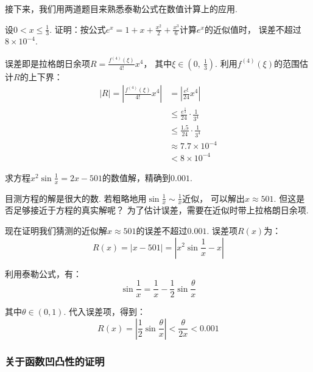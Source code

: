 接下来，我们用两道题目来熟悉泰勒公式在数值计算上的应用.

\begin{example}
\label{ex:ch04-40}
设$0 < x \le \frac{1}{3}$.
证明：按公式$e^x = 1 + x +\frac{x^2}{2} + \frac{x^3}{6}$计算$e^x$的近似值时，
误差不超过$8 \times {10}^{-4}$.
\end{example}

\begin{solution}
误差即是拉格朗日余项$R = \frac{f^{(4)}(\xi)}{4!} x^4$，
其中$\xi \in \left(0,~\frac{1}{3}\right)$.
利用$f^{(4)}(\xi)$的范围估计$R$的上下界：
\begin{equation}
    \begin{aligned}
        |R| = \left|\frac{f^{(4)}(\xi)}{4!} x^4\right| &= \left| \frac{e^{\xi}}{24} x^4 \right| \\
        &\le  \frac{e^{\frac{1}{3}}}{24} \cdot \frac{1}{3^4}  \\
        &\le \frac{1.5}{24} \cdot \frac{1}{3^4} \\
        &\approx 7.7\times {10}^{-4} \\
        &< 8 \times {10}^{-4}
        \nonumber
    \end{aligned}
\end{equation}
\end{solution}

\begin{example}
\label{ex:ch04-41}
求方程$x^2 \sin \frac{1}{x} = 2x -501$的数值解，精确到$0.001$.
\end{example}

\begin{analysis}
目测方程的解是很大的数.
若粗略地用$\sin \frac{1}{x} \sim \frac{1}{x}$近似，
可以解出$x \approx 501$.
但这是否足够接近于方程的真实解呢？
为了估计误差，需要在近似时带上拉格朗日余项.
\end{analysis}

\begin{solution}
现在证明我们猜测的近似解$x \approx 501$的误差不超过$0.001$.
误差项$R(x)$为：
$$
R(x) = |x -501| = \left| x^2 \sin \frac{1}{x} -x \right|
$$\par
利用泰勒公式，有：
$$
\sin \frac{1}{x} = \frac{1}{x} - \frac{1}{2} \sin \frac{\theta}{x}
$$

其中$\theta \in (0,1)$.
代入误差项，得到：
$$
R(x) = \left| \frac{1}{2} \sin \frac{\theta}{x} \right| < \frac{\theta}{2x} < 0.001
$$
\end{solution}

\subsubsection{关于函数凹凸性的证明}

